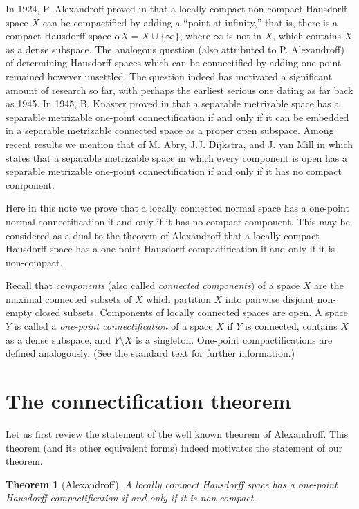 \documentclass{amsart}
\newtheorem{theorem}{Theorem}
\newenvironment{proof of claim}{\noindent\textbf{Proof of the claim.}}{\hfill{$\square$}\newline}
\theoremstyle{definition}
\theoremstyle{remark}
\numberwithin{equation}{section}
\begin{document}
In 1924, P. Alexandroff proved in \cite{A} that a locally compact non-compact Hausdorff space $X$ can be compactified by adding a ``point at infinity,'' that is, there is a compact Hausdorff space $\alpha X=X\cup\{\infty\}$, where $\infty$ is not in $X$, which contains $X$ as a dense subspace. The analogous question (also attributed to P. Alexandroff) of determining Hausdorff spaces which can be connectified by adding one point remained however unsettled. The question indeed has motivated a significant amount of research so far, with perhaps the earliest serious one dating as far back as 1945. In 1945, B. Knaster proved in \cite{Kn} that a separable metrizable space has a separable metrizable one-point connectification if and only if it can be embedded in a separable metrizable connected space as a proper open subspace. Among recent results we mention that of M. Abry, J.J. Dijkstra, and J. van Mill in \cite{ADvM} which states that a separable metrizable space in which every component is open has a separable metrizable one-point connectification if and only if it has no compact component.

Here in this note we prove that a locally connected normal space has a one-point normal connectification if and only if it has no compact component. This may be considered as a dual to the theorem of Alexandroff that a locally compact Hausdorff space has a one-point Hausdorff compactification if and only if it is non-compact.

Recall that \textit{components} (also called \textit{connected components}) of a space $X$ are the maximal connected subsets of $X$ which partition $X$ into pairwise disjoint non-empty closed subsets. Components of locally connected spaces are open. A space $Y$ is called a \textit{one-point connectification} of a space $X$ if $Y$ is connected, contains $X$ as a dense subspace, and $Y\setminus X$ is a singleton. One-point compactifications are defined analogously. (See the standard text \cite{E} for further information.)

\section{The connectification theorem}

Let us first review the statement of the well known theorem of Alexandroff. This theorem (and its other equivalent forms) indeed motivates the statement of our theorem.

\begin{theorem}[Alexandroff]\label{KLFA}
A locally compact Hausdorff space has a one-point Hausdorff compactification if and only if it is non-compact.
\end{theorem}
\end{document}
